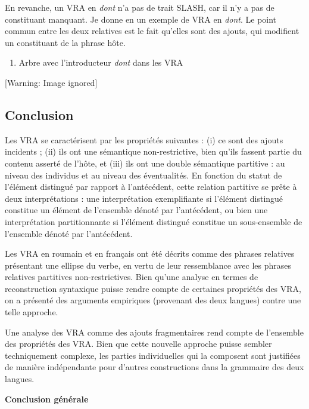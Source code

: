 En revanche, un VRA en \textit{dont} n'a pas de trait SLASH, car il n'y a pas de constituant manquant. Je donne en  un exemple de VRA en \textit{dont}. Le point commun entre les deux relatives est le fait qu'elles sont des ajouts, qui modifient un constituant de la phrase hôte.


\begin{enumerate}
\item \label{bkm:Ref299041282}Arbre avec l'introducteur \textit{dont} dans les VRA 


\end{enumerate}
  [Warning: Image ignored] %
 

\subsection{Conclusion}
Les VRA se caractérisent par les propriétés suivantes : (i) ce sont des ajouts incidents ; (ii) ils ont une sémantique non-restrictive, bien qu'ils fassent partie du contenu asserté de l'hôte, et (iii) ils ont une double sémantique partitive : au niveau des individus et au niveau des éventualités. En fonction du statut de l'élément distingué par rapport à l'antécédent, cette relation partitive se prête à deux interprétations : une interprétation exemplifiante si l'élément distingué constitue un élément de l'ensemble dénoté par l'antécédent, ou bien une interprétation partitionnante si l'élément distingué constitue un sous-ensemble de l'ensemble dénoté par l'antécédent. 

Les VRA en roumain et en français ont été décrits comme des phrases relatives présentant une ellipse du verbe, en vertu de leur ressemblance avec les phrases relatives partitives non-restrictives. Bien qu'une analyse en termes de reconstruction syntaxique puisse rendre compte de certaines propriétés des VRA, on a présenté des arguments empiriques (provenant des deux langues) contre une telle approche. 

Une analyse des VRA comme des ajouts fragmentaires rend compte de l'ensemble des propriétés des VRA. Bien que cette nouvelle approche puisse sembler techniquement complexe, les parties individuelles qui la composent sont justifiées de manière indépendante pour d'autres constructions dans la grammaire des deux langues. 



{\bfseries
Conclusion générale
}

